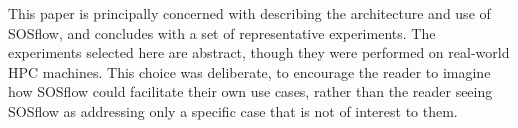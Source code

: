 %
This paper is principally concerned with describing the architecture and use
of SOSflow, and concludes with a set of representative experiments.
%
The experiments selected here are abstract, though they were performed on
real-world HPC machines.
%
This choice was deliberate, to encourage the reader to imagine how SOSflow
could facilitate their own use cases, rather than the reader seeing SOSflow as
addressing only a specific case that is not of interest to them.
%

